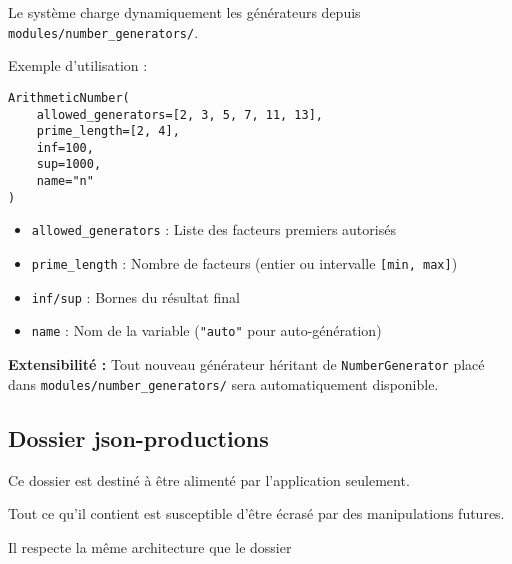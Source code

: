 Le système charge dynamiquement les générateurs depuis \texttt{modules/number\_generators/}. 

Exemple d'utilisation :

\begin{tcolorbox}[colback=white,colframe=defi,boxrule=0.4pt]
\begin{verbatim}
ArithmeticNumber(
    allowed_generators=[2, 3, 5, 7, 11, 13],
    prime_length=[2, 4],
    inf=100,
    sup=1000,
    name="n"
)
\end{verbatim}
\end{tcolorbox}

\begin{itemize}
    \item \texttt{allowed\_generators} : Liste des facteurs premiers autorisés
    \item \texttt{prime\_length} : Nombre de facteurs (entier ou intervalle \texttt{[min, max]})
    \item \texttt{inf/sup} : Bornes du résultat final
    \item \texttt{name} : Nom de la variable (\texttt{"auto"} pour auto-génération)
\end{itemize}

\textbf{Extensibilité :} Tout nouveau générateur héritant de \texttt{NumberGenerator} placé dans \texttt{modules/number\_generators/} sera automatiquement disponible. 

\subsection{Dossier json-productions}

Ce dossier est destiné à être alimenté par l'application seulement. 

Tout ce qu'il contient est susceptible d'être écrasé par des manipulations futures. 

Il respecte la même architecture que le dossier 